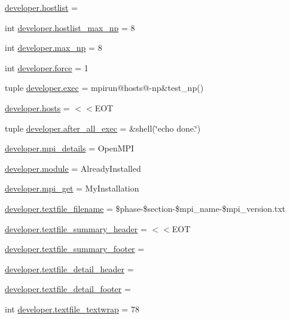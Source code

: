 \begin{DoxyCompactItemize}
\item 
\hyperlink{namespacedeveloper_a4ae5cd1ac5f1f3c712a1356615cc4883}{developer.\-hostlist} =
\item 
int \hyperlink{namespacedeveloper_a13c279bb81fd7dcabc6f5d521e479aa3}{developer.\-hostlist\-\_\-max\-\_\-np} = 8
\item 
int \hyperlink{namespacedeveloper_ae3c0c16810bf766d5d343a96a25ed5f5}{developer.\-max\-\_\-np} = 8
\item 
int \hyperlink{namespacedeveloper_a80fe514b51ced8931e7aee0e115c57fe}{developer.\-force} = 1
\item 
tuple \hyperlink{namespacedeveloper_a350aecc0787354537b0c7f0c30b6ea96}{developer.\-exec} = mpirun@hosts@-\/np\&test\-\_\-np()
\item 
\hyperlink{namespacedeveloper_a306d0b8e053855bb90f9a1e892fb95de}{developer.\-hosts} = $<$$<$E\-O\-T
\item 
tuple \hyperlink{namespacedeveloper_a458db43e4dbfd00d4faf1c4190b5e108}{developer.\-after\-\_\-all\-\_\-exec} = \&shell(\char`\"{}echo done.\char`\"{})
\item 
\hyperlink{namespacedeveloper_a0d42d665be955c321eff953fda57debe}{developer.\-mpi\-\_\-details} = Open\-M\-P\-I
\item 
\hyperlink{namespacedeveloper_a2b87fdf0293735256891d21cd3fdf1c4}{developer.\-module} = Already\-Installed
\item 
\hyperlink{namespacedeveloper_ab22b1cccdd72c1ccebf6fb0b6b2c5b12}{developer.\-mpi\-\_\-get} = My\-Installation
\item 
\hyperlink{namespacedeveloper_a62386bf6ee2885e1743404547371cb44}{developer.\-textfile\-\_\-filename} = \$phase-\/\$section-\/\$mpi\-\_\-name-\/\$mpi\-\_\-version.\-txt
\item 
\hyperlink{namespacedeveloper_ac74e1296a1651a7640f6d7148c4e8181}{developer.\-textfile\-\_\-summary\-\_\-header} = $<$$<$E\-O\-T
\item 
\hyperlink{namespacedeveloper_a26c0369c438cb986cdf6a00bec4d4240}{developer.\-textfile\-\_\-summary\-\_\-footer} =
\item 
\hyperlink{namespacedeveloper_ade719fb9c04af75a723b6d594610ccfc}{developer.\-textfile\-\_\-detail\-\_\-header} =
\item 
\hyperlink{namespacedeveloper_a99feae7126d21d7db9a97a595cbb3126}{developer.\-textfile\-\_\-detail\-\_\-footer} =
\item 
int \hyperlink{namespacedeveloper_ae83d713d6405a20cfa321847993e98bc}{developer.\-textfile\-\_\-textwrap} = 78
\end{DoxyCompactItemize}
